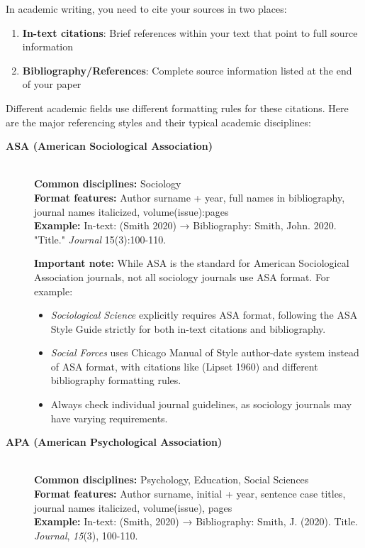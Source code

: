 \documentclass[11pt,a4paper]{ltxdoc}
\begin{document}
In academic writing, you need to cite your sources in two places:

\begin{enumerate}
  \item \textbf{In-text citations}: Brief references within your text that point to full source information
  \item \textbf{Bibliography/References}: Complete source information listed at the end of your paper
\end{enumerate}

Different academic fields use different formatting rules for these citations. Here are the major referencing styles and their typical academic disciplines:

\begin{description}
  \item[\textbf{ASA (American Sociological Association)}] \hfill \\
  \textbf{Common disciplines:} Sociology \\
  \textbf{Format features:} Author surname + year, full names in bibliography, journal names italicized, volume(issue):pages \\
  \textbf{Example:} In-text: (Smith 2020) → Bibliography: Smith, John. 2020. "Title." \emph{Journal} 15(3):100-110.
  
  \textbf{Important note:} While ASA is the standard for American Sociological Association journals, not all sociology journals use ASA format. For example:
  \begin{itemize}
    \item \emph{Sociological Science} explicitly requires ASA format, following the ASA Style Guide strictly for both in-text citations and bibliography.
    \item \emph{Social Forces} uses Chicago Manual of Style author-date system instead of ASA format, with citations like (Lipset 1960) and different bibliography formatting rules.
    \item Always check individual journal guidelines, as sociology journals may have varying requirements.
  \end{itemize}
  
  \item[\textbf{APA (American Psychological Association)}] \hfill \\
  \textbf{Common disciplines:} Psychology, Education, Social Sciences \\
  \textbf{Format features:} Author surname, initial + year, sentence case titles, journal names italicized, volume(issue), pages \\
  \textbf{Example:} In-text: (Smith, 2020) → Bibliography: Smith, J. (2020). Title. \emph{Journal}, \emph{15}(3), 100-110.
  

\end{description}
\end{document}
